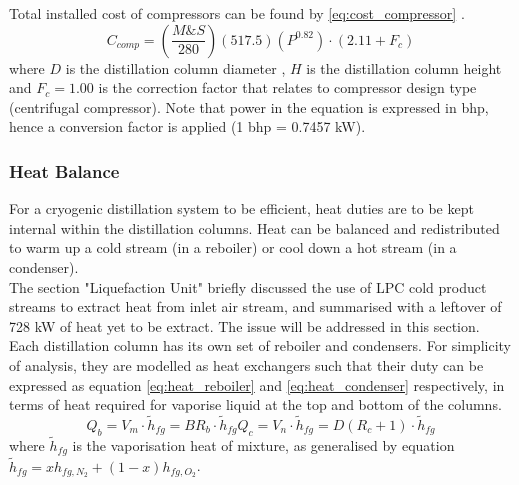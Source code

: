 	\noindent Total installed cost of compressors can be found by \ref{eq:cost_compressor} \citep{douglas1988}. 
	\begin{equation}
	    C_{comp} = \left(\frac{M\&S}{280}\right)\left(517.5\right)\left(P^{0.82}\right)\cdot \left(2.11 + F_c\right)
	    \label{eq:cost_compressor}
	\end{equation}
	where $D$ is the distillation column diameter , $H$ is the distillation column height and $F_c = 1.00$ is the correction factor that relates to compressor design type (centrifugal compressor). Note that power in the equation is expressed in bhp, hence a conversion factor is applied (1 bhp = 0.7457 kW).
	\subsubsection{Heat Balance} \noindent \noindent
    For a cryogenic distillation system to be efficient, heat duties are to be kept internal within the distillation columns. Heat can be balanced and redistributed to warm up a cold stream (in a reboiler) or cool down a hot stream (in a condenser). \\ 
    The section "Liquefaction Unit" briefly discussed the use of LPC cold product streams to extract heat from inlet air stream, and summarised with a leftover of 728 kW of heat yet to be extract. The issue will be addressed in this section.
        Each distillation column has its own set of reboiler and condensers. For simplicity of analysis, they are modelled as heat exchangers such that their duty can be expressed as equation \ref{eq:heat_reboiler} and \ref{eq:heat_condenser} respectively, in terms of heat required for vaporise liquid at the top and bottom of the columns.
        \begin{subequations}
            \begin{equation}
                Q_{b} = V_m \cdot \tilde{h}_{fg} = BR_b \cdot \tilde{h}_{fg}
                \label{eq:heat_reboiler}
            \end{equation}
            \begin{equation}
                Q_{c} = V_n \cdot \tilde{h}_{fg} = D(R_c+1) \cdot \tilde{h}_{fg}
                \label{eq:heat_condenser}
            \end{equation}
		\end{subequations}
		where $\tilde{h}_{fg}$ is the vaporisation heat of mixture, as generalised by equation $\tilde{h}_{fg} = xh_{fg,N_2} + (1-x)h_{fg,O_2}$. \\
		
